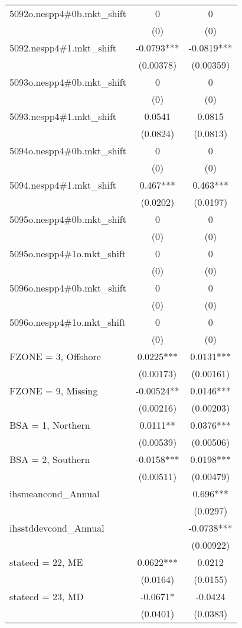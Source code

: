 \begin{tabular}{lcc}
5092o.nespp4\#0b.mkt\_shift & 0 & 0 \\
 & (0) & (0) \\
5092.nespp4\#1.mkt\_shift & -0.0793*** & -0.0819*** \\
 & (0.00378) & (0.00359) \\
5093o.nespp4\#0b.mkt\_shift & 0 & 0 \\
 & (0) & (0) \\
5093.nespp4\#1.mkt\_shift & 0.0541 & 0.0815 \\
 & (0.0824) & (0.0813) \\
5094o.nespp4\#0b.mkt\_shift & 0 & 0 \\
 & (0) & (0) \\
5094.nespp4\#1.mkt\_shift & 0.467*** & 0.463*** \\
 & (0.0202) & (0.0197) \\
5095o.nespp4\#0b.mkt\_shift & 0 & 0 \\
 & (0) & (0) \\
5095o.nespp4\#1o.mkt\_shift & 0 & 0 \\
 & (0) & (0) \\
5096o.nespp4\#0b.mkt\_shift & 0 & 0 \\
 & (0) & (0) \\
5096o.nespp4\#1o.mkt\_shift & 0 & 0 \\
 & (0) & (0) \\
FZONE = 3, Offshore & 0.0225*** & 0.0131*** \\
 & (0.00173) & (0.00161) \\
FZONE = 9, Missing & -0.00524** & 0.0146*** \\
 & (0.00216) & (0.00203) \\
BSA = 1, Northern & 0.0111** & 0.0376*** \\
 & (0.00539) & (0.00506) \\
BSA = 2, Southern & -0.0158*** & 0.0198*** \\
 & (0.00511) & (0.00479) \\
ihsmeancond\_Annual &  & 0.696*** \\
 &  & (0.0297) \\
ihsstddevcond\_Annual &  & -0.0738*** \\
 &  & (0.00922) \\
statecd = 22, ME & 0.0622*** & 0.0212 \\
 & (0.0164) & (0.0155) \\
statecd = 23, MD & -0.0671* & -0.0424 \\
 & (0.0401) & (0.0383) \\

\end{tabular}
